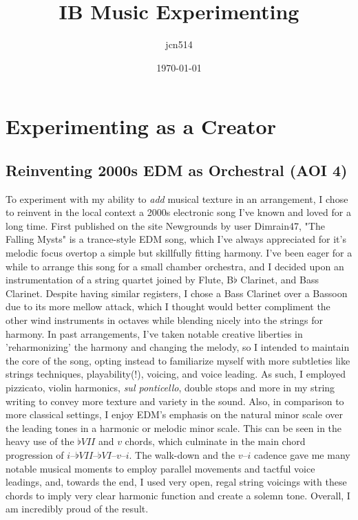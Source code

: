 \documentclass[12pt]{article}
\author{jcn514}
\title{IB Music Experimenting}
\date{\today}
\begin{document}
\maketitle
\tableofcontents

\pagebreak


\section{Experimenting as a Creator}

\subsection{Reinventing 2000s EDM as Orchestral (AOI 4)}

To experiment with my ability to \textit{add} musical texture in an arrangement, I chose to reinvent in the local context a 2000s electronic song I've known and loved for a long time. First published on the site Newgrounds by user Dimrain47, "The Falling Mysts" is a trance-style EDM song, which I've always appreciated for it's melodic focus overtop a simple but skillfully fitting harmony. I've been eager for a while to arrange this song for a small chamber orchestra, and I decided upon an instrumentation of a string quartet joined by Flute, B$\flat$ Clarinet, and Bass Clarinet. Despite having similar registers, I chose a Bass Clarinet over a Bassoon due to its more mellow attack, which I thought would better compliment the other wind instruments in octaves while blending nicely into the strings for harmony. In past arrangements, I've taken notable creative liberties in 'reharmonizing' the harmony and changing the melody, so I intended to maintain the core of the song, opting instead to familiarize myself with more subtleties like strings techniques, playability(!), voicing, and voice leading. As such, I employed pizzicato, violin harmonics, \textit{sul ponticello}, double stops and more in my string writing to convey more texture and variety in the sound. Also, in comparison to more classical settings, I enjoy EDM's emphasis on the natural minor scale over the leading tones in a harmonic or melodic minor scale. This can be seen in the heavy use of the $\flat VII$ and $v$ chords, which culminate in the main chord progression of $i–\flat VII–\flat VI–v–i$. The walk-down and the $v–i$ cadence gave me many notable musical moments to employ parallel movements and tactful voice leadings, and, towards the end, I used very open, regal string voicings with these chords to imply very clear harmonic function and create a solemn tone. Overall, I am incredibly proud of the result.
\end{document}
